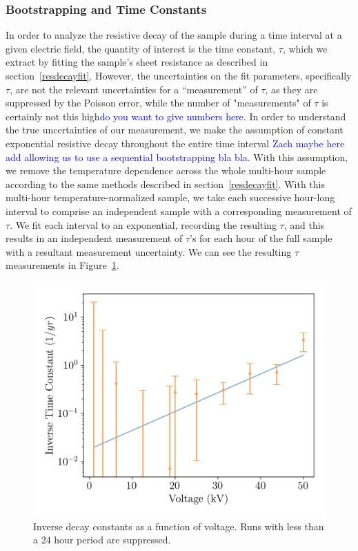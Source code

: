\documentclass[a4paper,12pt]{article}
\newcommand{\RI}[1]{\textcolor{blue}{#1}}
\begin{document}
\subsubsection{Bootstrapping and Time Constants}
In order to analyze the resistive decay of the sample during a time interval at a given electric field, the quantity of interest is the time constant, $\tau$, which we extract by fitting the sample's sheet resistance as described in section~\ref{resdecayfit}. However, the uncertainties on the fit parameters, specifically $\tau$, are not the relevant uncertainties for a ``measurement'' of $\tau$, as they are suppressed by the Poisson error, while the number of "measurements" of $\tau$ is certainly not this high\RI{do you want to give numbers here}. In order to understand the true uncertainties of our measurement, we make the assumption of constant exponential resistive decay throughout the entire time interval \RI{Zach maybe here add allowing us to use a sequential bootstrapping bla bla}. With this assumption, we remove the temperature dependence across the whole multi-hour sample according to the same methods described in section~\ref{resdecayfit}. With this multi-hour temperature-normalized sample, we take each successive hour-long interval to comprise an independent sample with a corresponding measurement of $\tau$. We fit each interval to an exponential, recording the resulting $\tau$, and this results in an independent measurement of $\tau$'s for each hour of the full sample with a resultant measurement uncertainty. We can see the resulting $\tau$ measurements in Figure~\ref{fig:invtaulog}.

\begin{figure}
	\begin{center}
		
		\includegraphics[width=0.75\linewidth]{tau.png}
		\caption{Inverse decay constants as a function of voltage. Runs with less than a 24 hour period are suppressed.} 
		\label{fig:invtaulog}
	\end{center}
	
\end{figure}
\end{document}

